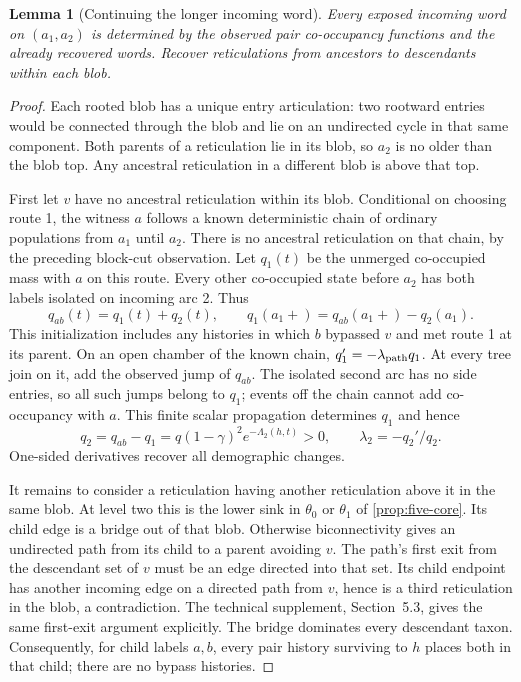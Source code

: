 \documentclass[11pt]{article}
\newtheorem{lemma}[theorem]{Lemma}
\begin{document}
\begin{lemma}[Continuing the longer incoming word]
\label{lem:incoming-long}
Every exposed incoming word on $(a_1,a_2)$ is determined by the observed
pair co-occupancy functions and the already recovered words.  Recover
reticulations from ancestors to descendants within each blob.
\end{lemma}
\begin{proof}
Each rooted blob has a unique entry articulation: two rootward entries
would be connected through the blob and lie on an undirected cycle in
that same component.  Both parents of a reticulation lie in its blob, so
$a_2$ is no older than the blob top.  Any ancestral reticulation in a
different blob is above that top.

First let $v$ have no ancestral reticulation within its blob.  Conditional
on choosing route 1, the witness $a$ follows a known deterministic chain
of ordinary populations from $a_1$ until $a_2$.  There is no ancestral
reticulation on that chain, by the preceding block-cut observation.  Let
$q_1(t)$ be the unmerged co-occupied mass with $a$ on this route.  Every
other co-occupied state before $a_2$ has both labels isolated on incoming
arc 2.  Thus
\[
 q_{ab}(t)=q_1(t)+q_2(t),\qquad
 q_1(a_1+)=q_{ab}(a_1+)-q_2(a_1).
\]
This initialization includes any histories in which $b$ bypassed $v$ and
met route 1 at its parent.  On an open chamber of the known chain,
$q_1'=-\lambda_{\rm path}q_1$.  At every tree join on it, add the observed
jump of $q_{ab}$.  The isolated second arc has no side entries, so all such
jumps belong to $q_1$; events off the chain cannot add co-occupancy with
$a$.  This finite scalar propagation determines $q_1$ and hence
\[
 q_2=q_{ab}-q_1=q(1-\gamma)^2e^{-\Lambda_2(h,t)}>0,
 \qquad \lambda_2=-q_2'/q_2.
\]
One-sided derivatives recover all demographic changes.

It remains to consider a reticulation having another reticulation above it
in the same blob.  At level two this is the lower sink in
$\theta_0$ or $\theta_1$ of \cref{prop:five-core}.  Its child edge is a
bridge out of that blob.  Otherwise biconnectivity gives an undirected path
from its child to a parent avoiding $v$.  The path's first exit from the
descendant set of $v$ must be an edge directed into that set.  Its child
endpoint has another incoming edge on a directed path from $v$, hence is
a third reticulation in the blob, a contradiction.  The technical
supplement, Section~5.3, gives the same first-exit argument explicitly.
The bridge
dominates every descendant taxon.  Consequently, for child labels $a,b$,
every pair history surviving to $h$ places both in that child; there are
no bypass histories.


\end{proof}
\end{document}
